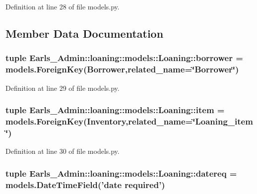 Definition at line 28 of file models.py.

\subsection{Member Data Documentation}
\hypertarget{classEarls__Admin_1_1loaning_1_1models_1_1Loaning_4fd2a1f45e68469f39f3e387cb53d8d3}{
\subsubsection[borrower]{\setlength{\rightskip}{0pt plus 5cm}tuple {\bf Earls\_\-Admin::loaning::models::Loaning::borrower} = models.ForeignKey({\bf Borrower},related\_\-name=\char`\"{}Borrower\char`\"{})}}
\label{classEarls__Admin_1_1loaning_1_1models_1_1Loaning_4fd2a1f45e68469f39f3e387cb53d8d3}




Definition at line 29 of file models.py.\hypertarget{classEarls__Admin_1_1loaning_1_1models_1_1Loaning_ee09502420d30136aa50f6419000b8ba}{
\subsubsection[item]{\setlength{\rightskip}{0pt plus 5cm}tuple {\bf Earls\_\-Admin::loaning::models::Loaning::item} = models.ForeignKey({\bf Inventory},related\_\-name=\char`\"{}Loaning\_\-item\char`\"{})}}
\label{classEarls__Admin_1_1loaning_1_1models_1_1Loaning_ee09502420d30136aa50f6419000b8ba}




Definition at line 30 of file models.py.\hypertarget{classEarls__Admin_1_1loaning_1_1models_1_1Loaning_f0f7ea4797359ee90acc09c7063e6ff0}{
\subsubsection[datereq]{\setlength{\rightskip}{0pt plus 5cm}tuple {\bf Earls\_\-Admin::loaning::models::Loaning::datereq} = models.DateTimeField('date required')}}
\label{classEarls__Admin_1_1loaning_1_1models_1_1Loaning_f0f7ea4797359ee90acc09c7063e6ff0}




